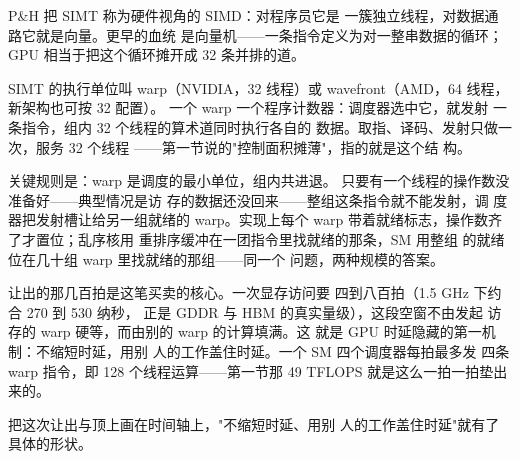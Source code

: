 \begin{classicnote}
P\&H 把 SIMT 称为硬件视角的 SIMD：对程序员它是
一簇独立线程，对数据通路它就是向量。更早的血统
是向量机——一条指令定义为对一整串数据的循环；
GPU 相当于把这个循环摊开成 32 条并排的道。
\end{classicnote}

SIMT 的执行单位叫 warp（NVIDIA，32 线程）或
wavefront（AMD，64 线程，新架构也可按 32 配置）。
一个 warp 一个程序计数器：调度器选中它，就发射
一条指令，组内 32 个线程的算术道同时执行各自的
数据。取指、译码、发射只做一次，服务 32 个线程
——第一节说的"控制面积摊薄"，指的就是这个结
构。

关键规则是：warp 是调度的最小单位，组内共进退。
只要有一个线程的操作数没准备好——典型情况是访
存的数据还没回来——整组这条指令就不能发射，调
度器把发射槽让给另一组就绪的 warp。实现上每个
warp 带着就绪标志，操作数齐了才置位；乱序核用
重排序缓冲在一团指令里找就绪的那条，SM 用整组
的就绪位在几十组 warp 里找就绪的那组——同一个
问题，两种规模的答案。

让出的那几百拍是这笔买卖的核心。一次显存访问要
四到八百拍（1.5 GHz 下约合 270 到 530 纳秒，
正是 GDDR 与 HBM 的真实量级），这段空窗不由发起
访存的 warp 硬等，而由别的 warp 的计算填满。这
就是 GPU 时延隐藏的第一机制：不缩短时延，用别
人的工作盖住时延。一个 SM 四个调度器每拍最多发
四条 warp 指令，即 128 个线程运算——第一节那
49 TFLOPS 就是这么一拍一拍垫出来的。

把这次让出与顶上画在时间轴上，"不缩短时延、用别
人的工作盖住时延"就有了具体的形状。

